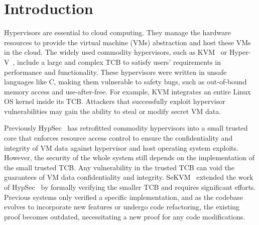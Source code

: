 
\chapter{Introduction}

Hypervisors are essential to cloud computing. They manage the hardware
resources to provide the virtual machine (VMs) abstraction and host
these VMs in the cloud.
The widely used commodity
hypervisors, such as KVM~\cite{kivity07kvm} or Hyper-V~\cite{hyperv},
include a large and complex TCB to satisfy users' requirements in
performance and functionality. These hypervisors were written in unsafe
languages like C, making them vulnerable to safety bugs, such as
out-of-bound memory access and use-after-free. For example, KVM
integrates an entire Linux OS kernel inside its TCB. Attackers that
successfully exploit hypervisor vulnerabilities may gain the ability
to steal or modify secret VM data.

Previously HypSec~\cite{hypsec} has retrofitted commodity hypervisors into a
small trusted core that enforces resource access control to ensure the
confidentiality and integrity of VM data against hypervisor and host operating
system exploits. However, the security of the whole system still depends on the
implementation of the small trusted TCB. Any vulnerability in the trusted TCB
can void the guarantees of VM data confidentiality and integrity.
SeKVM~\cite{sekvm} extended the work of HypSec~\cite{hypsec} by formally
verifying the smaller TCB and requires significant efforts. Previous systems
only verified a specific implementation, and as the codebase evolves to
incorporate new features or undergo code refactoring, the existing proof
becomes outdated, necessitating a new proof for any code modifications.


